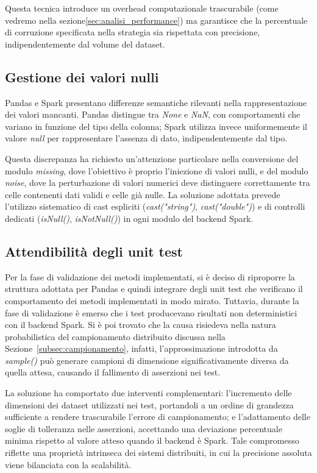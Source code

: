\documentclass[../main.tex]{subfiles}
\begin{document}
Questa tecnica introduce un overhead computazionale trascurabile (come vedremo nella sezione\ref{sec:analisi_performance}) ma garantisce che la percentuale di corruzione specificata nella strategia sia rispettata con precisione, indipendentemente dal volume del dataset.

\subsection{Gestione dei valori nulli}

Pandas e Spark presentano differenze semantiche rilevanti nella 
rappresentazione dei valori mancanti. Pandas distingue tra \textit{None} e 
\textit{NaN}, con comportamenti che variano in funzione del tipo della colonna; 
Spark utilizza invece uniformemente il valore \textit{null} per rappresentare 
l'assenza di dato, indipendentemente dal tipo.

Questa discrepanza ha richiesto un'attenzione particolare nella conversione 
del modulo \textit{missing}, dove l'obiettivo è proprio l'iniezione di 
valori nulli, e del modulo \textit{noise}, dove la perturbazione di valori 
numerici deve distinguere correttamente tra celle contenenti dati validi e 
celle già nulle. La soluzione adottata prevede l'utilizzo sistematico di 
cast espliciti (\textit{cast("string")}, \textit{cast("double")}) e di 
controlli dedicati (\textit{isNull()}, \textit{isNotNull()}) in ogni modulo 
del backend Spark.

\subsection{Attendibilità degli unit test}
Per la fase di validazione dei metodi implementati, si è deciso di riproporre la struttura adottata per Pandas e quindi integrare degli unit test che verificano il comportamento dei metodi implementati in modo mirato. Tuttavia, durante la fase di validazione è emerso che i test producevano risultati non deterministici con il backend Spark. Si è poi trovato che la causa risiedeva nella natura probabilistica del campionamento distribuito discussa nella Sezione~\ref{subsec:campionamento}, infatti, l'approssimazione introdotta da \textit{sample()} può generare campioni di dimensione significativamente diversa da quella attesa, causando il fallimento di asserzioni nei test.

La soluzione ha comportato due interventi complementari: l'incremento delle 
dimensioni dei dataset utilizzati nei test, portandoli a un ordine di 
grandezza sufficiente a rendere trascurabile l'errore di campionamento; e 
l'adattamento delle soglie di tolleranza nelle asserzioni, accettando una 
deviazione percentuale minima rispetto al valore atteso quando il backend è 
Spark. Tale compromesso riflette una proprietà intrinseca dei sistemi 
distribuiti, in cui la precisione assoluta viene bilanciata con la 
scalabilità.
\end{document}
